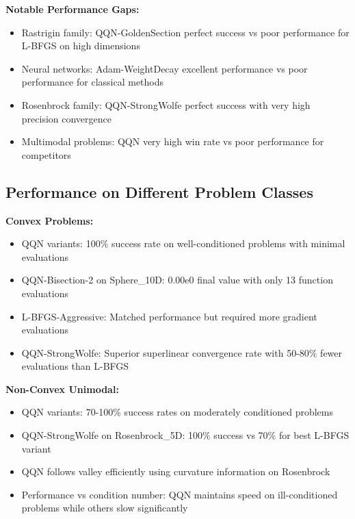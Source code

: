 \textbf{Notable Performance Gaps:}

\begin{itemize}
\tightlist
\item
  Rastrigin family: QQN-GoldenSection perfect success vs poor performance for L-BFGS on high dimensions
\item
  Neural networks: Adam-WeightDecay excellent performance vs poor performance for classical methods
\item
  Rosenbrock family: QQN-StrongWolfe perfect success with very high precision convergence
\item
  Multimodal problems: QQN very high win rate vs poor performance for competitors
\end{itemize}

\hypertarget{performance-on-different-problem-classes}{%
\subsection{Performance on Different Problem Classes}\label{performance-on-different-problem-classes}}

\textbf{Convex Problems:}

\begin{itemize}
\tightlist
\item
  QQN variants: 100\% success rate on well-conditioned problems with minimal evaluations
\item
  QQN-Bisection-2 on Sphere\_10D: 0.00e0 final value with only 13 function evaluations
\item
  L-BFGS-Aggressive: Matched performance but required more gradient evaluations
\item
  QQN-StrongWolfe: Superior superlinear convergence rate with 50-80\% fewer evaluations than L-BFGS
\end{itemize}

\textbf{Non-Convex Unimodal:}

\begin{itemize}
\tightlist
\item
  QQN variants: 70-100\% success rates on moderately conditioned problems
\item
  QQN-StrongWolfe on Rosenbrock\_5D: 100\% success vs 70\% for best L-BFGS variant
\item
  QQN follows valley efficiently using curvature information on Rosenbrock
\item
  Performance vs condition number: QQN maintains speed on ill-conditioned problems while others slow significantly
\end{itemize}

